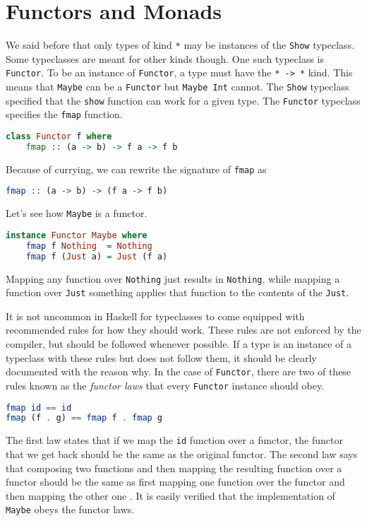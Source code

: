 \documentclass[MS, xcolor=dvipsnames]{wfuthesis}
\theoremstyle{definition}
\begin{document}
\section{Functors and Monads}
We said before that only types of kind \lstinline{*} may be instances of the \lstinline{Show} typeclass. Some typeclasses are meant for other kinds though. One such typeclass is \lstinline{Functor}. To be an instance of \lstinline{Functor}, a type must have the \lstinline{* -> *} kind. This means that \lstinline{Maybe} can be a \lstinline{Functor} but \lstinline{Maybe Int} cannot. The \lstinline{Show} typeclass specified that the \lstinline{show} function can work for a given type. The \lstinline{Functor} typeclass specifies the \lstinline{fmap} function. 
\begin{lstlisting}[language=Haskell]
class Functor f where
    fmap :: (a -> b) -> f a -> f b
\end{lstlisting}
Because of currying, we can rewrite the signature of \lstinline{fmap} as 
\begin{lstlisting}[language=Haskell]
fmap :: (a -> b) -> (f a -> f b)
\end{lstlisting}
Let's see how \lstinline{Maybe} is a functor.
\begin{lstlisting}[language=Haskell]
instance Functor Maybe where
    fmap f Nothing  = Nothing
    fmap f (Just a) = Just (f a)
\end{lstlisting}
Mapping any function over \lstinline{Nothing} just results in \lstinline{Nothing}, while mapping a function over \lstinline{Just} something applies that function to the contents of the \lstinline{Just}. \par 
It is not uncommon in Haskell for typeclasses to come equipped with recommended rules for how they should work. These rules are not enforced by the compiler, but should be followed whenever possible. If a type is an instance of a typeclass with these rules but does not follow them, it should be clearly documented with the reason why. In the case of \lstinline{Functor}, there are two of these rules known as the \emph{functor laws} that every \lstinline{Functor} instance should obey. 
\begin{lstlisting}[language=Haskell]
fmap id == id
fmap (f . g) == fmap f . fmap g
\end{lstlisting}
The first law states that if we map the \lstinline{id} function over a functor, the functor that we get back should be the same as the original functor. The second law says that composing two functions and then mapping the resulting function over a functor should be the same as first mapping one function over the functor and then mapping the other one \cite{Lipovaca2011}. It is easily verified that the implementation of \lstinline{Maybe} obeys the functor laws. \par 
\end{document}
